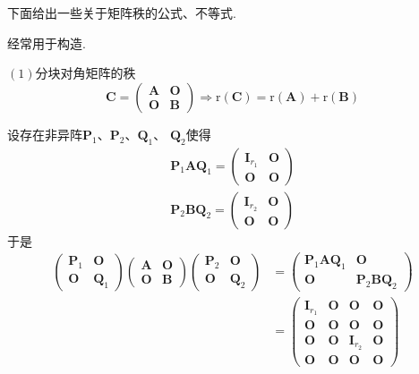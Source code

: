 下面给出一些关于矩阵秩的公式、不等式.
\begin{formal}
\begin{theorem}[分块三角和分块对角阵]\label{thm:分块三角和分块对角阵}
经常用于构造.

$(1)$分块对角矩阵的秩
\[
\bm{C} = \begin{pmatrix}
    \bm{A} & \bm{O} \\
    \bm{O} & \bm{B}
\end{pmatrix}
\Longrightarrow \mathrm{r}\left(\bm{C}
\right) = \mathrm{r}\left(\bm{A}
\right)+\mathrm{r}\left(\bm{B}
\right)
\]
\begin{Proof}
设存在非异阵$\bm{P}_1$、$\bm{P}_2$、$\bm{Q}_1$、
$\bm{Q}_2$使得
\begin{align*}
    \bm{P}_1\bm{AQ}_1=\begin{pmatrix}
        \bm{I}_{r_1}&\bm{O}\\
        \bm{O}&\bm{O}
    \end{pmatrix}\\
    \bm{P}_2\bm{BQ}_2=\begin{pmatrix}
        \bm{I}_{r_2}&\bm{O}\\\bm{O}&\bm{O}
    \end{pmatrix}
\end{align*}
于是
\begin{align*}
\begin{pmatrix}
    \bm{P}_1&\bm{O}\\\bm{O}&\bm{Q}_1
\end{pmatrix}
\begin{pmatrix}
    \bm{A}&\bm{O}\\
    \bm{O}&\bm{B}
\end{pmatrix}
\begin{pmatrix}
    \bm{P}_2&\bm{O}\\\bm{O}&\bm{Q}_2
\end{pmatrix}
&=\begin{pmatrix}
    \bm{P}_1\bm{AQ}_1&\bm{O}\\
    \bm{O}&\bm{P}_2\bm{BQ}_2
\end{pmatrix}\\
&=\begin{pmatrix}
    \bm{I}_{r_1}&\bm{O}&\bm{O}&\bm{O}\\
    \bm{O}&\bm{O}&\bm{O}&\bm{O}\\
    \bm{O}&\bm{O}&\bm{I}_{r_2}&\bm{O}\\
    \bm{O}&\bm{O}&\bm{O}&\bm{O}
\end{pmatrix}
\end{align*}

\end{Proof}
\end{theorem}
\end{formal}
